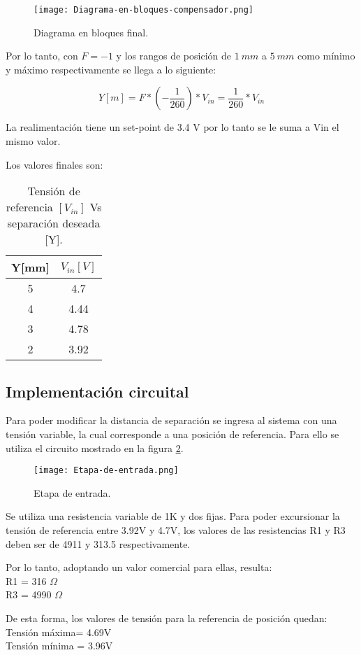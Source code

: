 \begin{figure}[H]
	\centering
	\texttt{[image: Diagrama-en-bloques-compensador.png]}
	\caption{Diagrama en bloques final.}
	\label{fig:diag-bloques-compensador}
\end{figure}

\noindent Por lo tanto, con $F=-1$ y los rangos de posición de $1\:mm$ a $5\:mm$ como mínimo y máximo respectivamente se llega a lo siguiente:

\begin{equation} 
	Y[m] = F * (-\frac{1}{260})*V_{in} =\frac{1}{260}*V_{in} 
\end{equation}

\noindent La realimentación tiene un set-point de 3.4 V por lo tanto se le suma a Vin el mismo valor.

\noindent Los valores finales son:


\begin{table}[H]
	\begin{center}
		\begin{tabular}{| c | c |}
			\hline
			Y[mm] & $V_{in}[V]$\\ \hline
			5 & 4.7\\ \hline
			4 & 4.44 \\ \hline
			3 & 4.78\\ \hline
			2 &	3.92 \\ \hline		
		\end{tabular}
		\caption{Tensión de referencia $[V_{in}]$ Vs separación deseada [Y].}
		\label{tension-ref-vs-separacion-deseada}
	\end{center}
\end{table}

\subsection{Implementación circuital}

\noindent Para poder modificar la distancia de separación se ingresa al sistema con una tensión variable, la cual corresponde a una posición de referencia. Para ello se utiliza el circuito mostrado en la figura \ref{fig:etapa-de-entrada}.

\begin{figure}[H]
	\centering
	\texttt{[image: Etapa-de-entrada.png]}
	\caption{ Etapa de entrada.}
	\label{fig:etapa-de-entrada}
\end{figure}

 
 \noindent Se utiliza una resistencia variable de 1K y dos fijas. Para poder excursionar la tensión de referencia entre 3.92V y 4.7V, los valores de las resistencias R1 y R3 deben ser de 4911 y 313.5 respectivamente. 
 
\noindent Por lo tanto, adoptando un valor comercial para ellas, resulta:\\
\noindent R1 = 316 $\Omega$\\
\noindent R3 = 4990 $\Omega$
 
\noindent De esta forma, los valores de tensión para la referencia de posición quedan:\\
\noindent Tensión máxima= 4.69V\\
\noindent Tensión mínima = 3.96V
 
